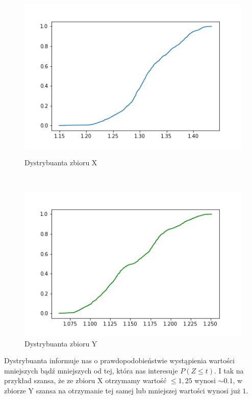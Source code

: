 \documentclass[12pt]{mwart}
\begin{document}
\begin{figure}[H]
	\begin{minipage}{.5\linewidth}
		\centering
		\includegraphics[scale=0.7]{X_cdf.PNG}
		\caption{Dystrybuanta zbioru X}
	\end{minipage}
	$\quad$
	\begin{minipage}{.5\linewidth}
		\centering
		\includegraphics[scale=0.7]{Y_cdf.PNG}
		\caption{Dystrybuanta zbioru Y}
	\end{minipage}
\end{figure}
\noindent Dystrybuanta informuje nas o prawdopodobieństwie wystąpienia wartości mniejszych bądź mniejszych od tej, która nas interesuje $P(Z \leq t)$. I tak na przykład szansa, że ze zbioru X otrzymamy wartość $\leq 1,25$ wynosi $\sim 0.1$, w zbiorze Y szansa na otrzymanie tej samej lub mniejszej wartości wynosi już $1$.
\end{document}
